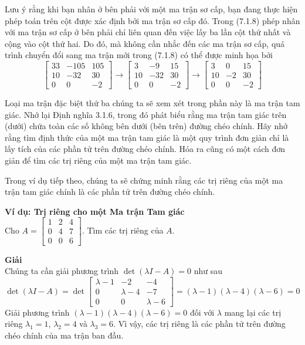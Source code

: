 Lưu ý rằng khi bạn nhân ở bên phải với một ma trận sơ cấp, bạn đang thực hiện phép toán trên cột được xác định bởi ma trận sơ cấp đó. Trong (7.1.8) phép nhân với ma trận sơ cấp ở bên phải chỉ liên quan đến việc lấy ba lần cột thứ nhất và cộng vào cột thứ hai. Do đó, mà không cần nhắc đến các ma trận sơ cấp, quá trình chuyển đổi sang ma trận mới trong (7.1.8) có thể được minh họa bởi
\begin{equation*}
\begin{bmatrix}33&-105&105\\ 10&-32&30\\ 0&0&-2\end{bmatrix}\rightarrow\begin{bmatrix}3&-9&15\\ 10&-32&30\\ 0&0&-2\end{bmatrix}\rightarrow\begin{bmatrix}3&0&15\\ 10&-2&30\\ 0&0&-2\end{bmatrix}
\end{equation*}

Loại ma trận đặc biệt thứ ba chúng ta sẽ xem xét trong phần này là ma trận tam giác. Nhớ lại Định nghĩa 3.1.6, trong đó phát biểu rằng ma trận tam giác trên (dưới) chứa toàn các số không bên dưới (bên trên) đường chéo chính. Hãy nhớ rằng tìm định thức của một ma trận tam giác là một quy trình đơn giản chỉ là lấy tích của các phần tử trên đường chéo chính. Hóa ra cũng có một cách đơn giản để tìm các trị riêng của một ma trận tam giác.

Trong ví dụ tiếp theo, chúng ta sẽ chứng minh rằng các trị riêng của một ma trận tam giác chính là các phần tử trên đường chéo chính.

\textbf{Ví dụ: Trị riêng cho một Ma trận Tam giác} \\
Cho $A=\begin{bmatrix}1&2&4\\ 0&4&7\\ 0&0&6\end{bmatrix}$. Tìm các trị riêng của $A$.

\textbf{Giải} \\
Chúng ta cần giải phương trình $\det(\lambda I-A)=0$ như sau
\begin{equation}
\det(\lambda I-A)=\det\begin{bmatrix}\lambda-1&-2&-4\\ 0&\lambda-4&-7\\ 0&0&\lambda-6\end{bmatrix}=(\lambda-1)(\lambda-4)(\lambda-6)=0
\end{equation}
Giải phương trình $(\lambda-1)(\lambda-4)(\lambda-6)=0$ đối với $\lambda$ mang lại các trị riêng $\lambda_{1}=1$, $\lambda_{2}=4$ và $\lambda_{3}=6$. Vì vậy, các trị riêng là các phần tử trên đường chéo chính của ma trận ban đầu.

